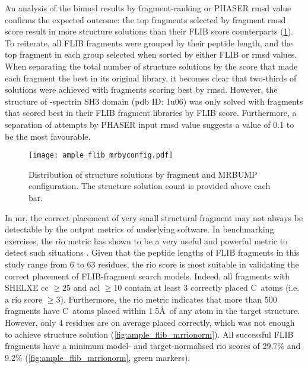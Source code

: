 An analysis of the binned results by fragment-ranking or PHASER \gls{rmsd} value confirms the expected outcome: the top fragments selected by fragment \gls{rmsd} score result in more structure solutions than their FLIB score counterparts (\cref{fig:ample_flib_mrbyconfig}). To reiterate, all FLIB fragments were grouped by their peptide length, and the top fragment in each group selected when sorted by either FLIB or \gls{rmsd} values. When separating the total number of structure solutions by the score that made each fragment the best in its original library, it becomes clear that two-thirds of solutions were achieved with fragments scoring best by \gls{rmsd}. However, the structure of \textalpha-spectrin SH3 domain (\gls{pdb} ID: 1u06) was only solved with fragments that scored best in their FLIB fragment libraries by FLIB score. Furthermore, a separation of attempts by PHASER input \gls{rmsd} value suggests a value of 0.1 to be the most favourable.

\begin{figure}[H]
	\centering
	\texttt{[image: ample\_flib\_mrbyconfig.pdf]}
	\caption[MR structure solutions by input parameters]{Distribution of structure solutions by fragment and MRBUMP configuration. The structure solution count is provided above each bar.}
	\label{fig:ample_flib_mrbyconfig}
\end{figure}

In \gls{mr}, the correct placement of very small structural fragment may not always be detectable by the output metrics of underlying software. In benchmarking exercises, the \gls{rio} metric has shown to be a very useful and powerful metric to detect such situations \cite{Thomas2015-ag,Simkovic2016-jx,Thomas2017-lq}. Given that the peptide lengths of FLIB fragments in this study range from 6 to 63 residues, the \gls{rio} score is most suitable in validating the correct placement of FLIB-fragment search models. Indeed, all fragments with SHELXE \gls{cc} $\geq25$ and \gls{acl} $\geq10$ contain at least 3 correctly placed C\textalpha\ atoms (i.e. a \gls{rio} score $\geq3$). Furthermore, the \gls{rio} metric indicates that more than 500 fragments have C\textalpha\ atoms placed within 1.5\AA\ of any atom in the target structure. However, only 4 residues are on average placed correctly, which was not enough to achieve structure solution (\cref{fig:ample_flib_mrrionorm}). All successful FLIB fragments have a minimum model- and target-normalised \gls{rio} scores of 29.7\% and 9.2\% (\cref{fig:ample_flib_mrrionorm}, green markers). 

